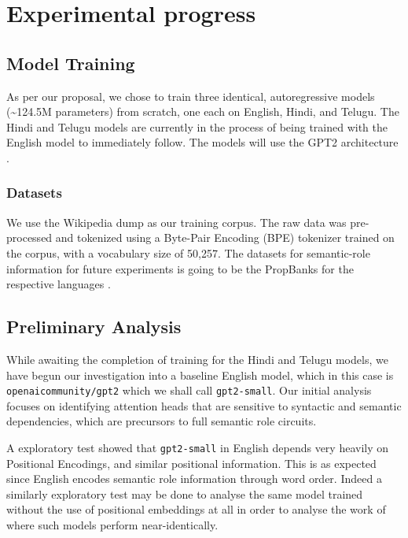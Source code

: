 \documentclass[11pt]{article}
\begin{document}
\section*{Experimental progress}
\label{sec:orgebc83d4}

\subsection*{Model Training}
\label{sec:org5aaf225}

As per our proposal, we chose to train three identical, autoregressive models (\textasciitilde{}124.5M parameters) from scratch, one each on English, Hindi, and Telugu. The Hindi and Telugu models are currently in the process of being trained with the English model to immediately follow. The models will use the GPT2 architecture \citep{Radford2019LanguageMA}.
\subsubsection*{Datasets}
\label{sec:org2c39c19}

We use the Wikipedia dump \citep{wikidump} as our training corpus. The raw data was pre-processed and tokenized using a Byte-Pair Encoding (BPE) tokenizer trained on the corpus, with a vocabulary size of 50,257.
The datasets for semantic-role information for future experiments is going to be the PropBanks for the respective languages \citep{10.1162/0891201053630264,Bhat2017,jindal-EtAl:2022:LREC,akbik-etal-2015-generating}.
\subsection*{Preliminary Analysis}
\label{sec:org6588ccb}

While awaiting the completion of training for the Hindi and Telugu models, we have begun our investigation into a baseline English model, which in this case is \texttt{openaicommunity/gpt2} which we shall call \texttt{gpt2-small}. Our initial analysis focuses on identifying attention heads that are sensitive to syntactic and semantic dependencies, which are precursors to full semantic role circuits.

A exploratory test showed that \texttt{gpt2-small} in English depends very heavily on Positional Encodings, and similar positional information. This is as expected since English encodes semantic role information through word order. Indeed a similarly exploratory test may be done to analyse the same model trained without the use of positional embeddings at all in order to analyse the work of \citet{haviv.etal2022} where such models perform near-identically.
\end{document}
